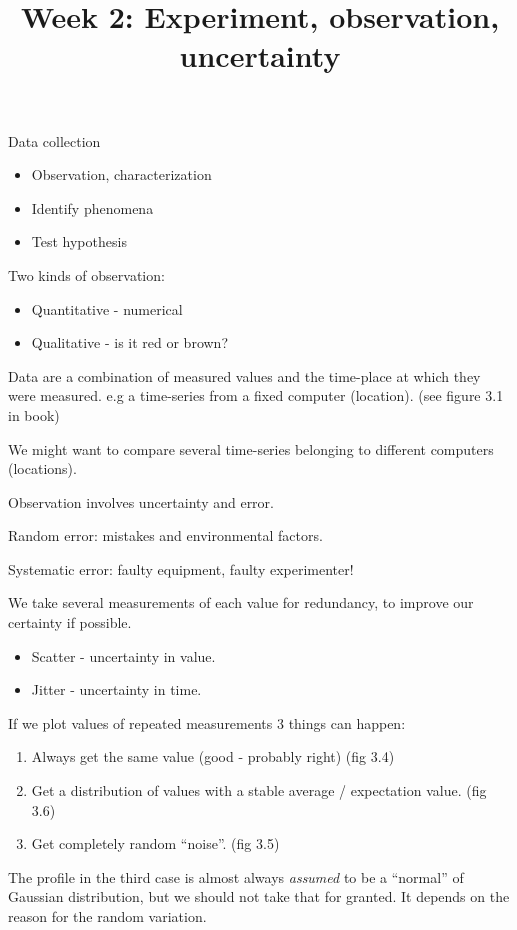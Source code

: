 \documentclass{slides}
\title{Week 2: Experiment, observation, uncertainty}
\begin{document}
\maketitle


Data collection
\begin{itemize}
\item Observation, characterization
\item Identify phenomena
\item Test hypothesis
\end{itemize}
Two kinds of observation:
\begin{itemize}
\item Quantitative - numerical
\item Qualitative - is it red or brown?
\end{itemize}


Data are a combination of measured values and the time-place at which they were measured.
e.g a time-series from a fixed computer (location). (see figure 3.1 in book)

We might want to compare several time-series belonging to different computers (locations).


Observation involves uncertainty and error.

Random error: mistakes and environmental factors.

Systematic error: faulty equipment, faulty experimenter!

We take several measurements of each value for redundancy, to improve our certainty if possible.
\begin{itemize}
\item Scatter - uncertainty in value.
\item Jitter - uncertainty in time.
\end{itemize}


If we plot values of repeated measurements 3 things can happen:
\begin{enumerate}
\item Always get the same value (good - probably right) (fig 3.4)
\item Get a distribution of values with a stable average / expectation value. (fig 3.6)
\item Get completely random ``noise''. (fig 3.5)
\end{enumerate}

The profile in the third case is almost always {\it assumed} to be a ``normal''
of Gaussian distribution, but we should not take that for granted. It depends on the reason
for the random variation.
\end{document}
